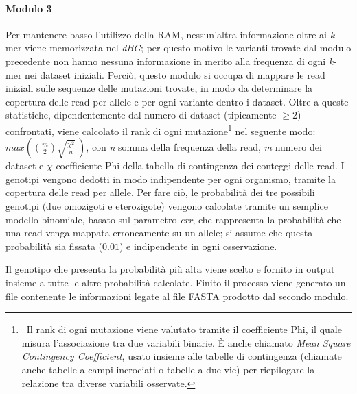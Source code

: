 \documentclass[../main.tex]{subfiles}
\begin{document}
\paragraph{Modulo 3} Per mantenere basso l'utilizzo della RAM, nessun'altra informazione oltre ai \textit{k}-mer viene memorizzata nel \textit{dBG}; per questo motivo le varianti trovate dal modulo precedente non hanno nessuna informazione in merito alla frequenza di ogni \textit{k}-mer nei dataset iniziali. Perciò, questo modulo si occupa di mappare le read iniziali sulle sequenze delle mutazioni trovate, in modo da determinare la copertura delle read per allele e per ogni variante dentro i dataset. Oltre a queste statistiche, dipendentemente dal numero di dataset (tipicamente $\geq2$) confrontati, viene calcolato il rank di ogni mutazione\footnote{\ Il rank di ogni mutazione viene valutato tramite il coefficiente Phi, il quale misura l'associazione tra due variabili binarie. È anche chiamato \textit{Mean Square Contingency Coefficient}, usato insieme alle tabelle di contingenza (chiamate anche tabelle a campi incrociati o tabelle a due vie) per riepilogare la relazione tra diverse variabili osservate.} nel seguente modo: $max\left( \binom{m}{2}\sqrt{\frac{\chi^2}{n}}\ \right)$, con \textit{n} somma della frequenza della read, \textit{m} numero dei dataset e $\chi$ coefficiente Phi della tabella di contingenza dei conteggi delle read. I genotipi vengono dedotti in modo indipendente per ogni organismo, tramite la copertura delle read per allele. Per fare ciò, le probabilità dei tre possibili genotipi (due omozigoti e eterozigote) vengono calcolate tramite un semplice modello binomiale, basato sul parametro \textit{err}, che rappresenta la probabilità che una read venga mappata erroneamente su un allele; si assume che questa probabilità sia fissata ($0.01$) e indipendente in ogni osservazione. 

Il genotipo che presenta la probabilità più alta viene scelto e fornito in output insieme a tutte le altre probabilità calcolate. Finito il processo viene generato un file contenente le informazioni legate al file FASTA prodotto dal secondo modulo.

%
%
%
\end{document}
